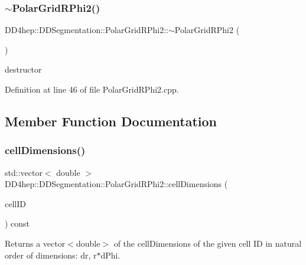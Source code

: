 \subsubsection{\texorpdfstring{$\sim$\+Polar\+Grid\+R\+Phi2()}{~PolarGridRPhi2()}}
{\footnotesize\ttfamily D\+D4hep\+::\+D\+D\+Segmentation\+::\+Polar\+Grid\+R\+Phi2\+::$\sim$\+Polar\+Grid\+R\+Phi2 (\begin{DoxyParamCaption}{ }\end{DoxyParamCaption})\hspace{0.3cm}{\ttfamily [virtual]}}



destructor 



Definition at line 46 of file Polar\+Grid\+R\+Phi2.\+cpp.



\subsection{Member Function Documentation}
\hypertarget{class_d_d4hep_1_1_d_d_segmentation_1_1_polar_grid_r_phi2_a64bcce17716dee34c3f648954a1ec830}{}\label{class_d_d4hep_1_1_d_d_segmentation_1_1_polar_grid_r_phi2_a64bcce17716dee34c3f648954a1ec830} 
\subsubsection{\texorpdfstring{cell\+Dimensions()}{cellDimensions()}}
{\footnotesize\ttfamily std\+::vector$<$ double $>$ D\+D4hep\+::\+D\+D\+Segmentation\+::\+Polar\+Grid\+R\+Phi2\+::cell\+Dimensions (\begin{DoxyParamCaption}\item[{const \hyperlink{namespace_d_d4hep_1_1_d_d_segmentation_ac7af071d85cb48820914434a07e21ba1}{Cell\+ID} \&}]{cell\+ID }\end{DoxyParamCaption}) const\hspace{0.3cm}{\ttfamily [virtual]}}



Returns a vector$<$double$>$ of the cell\+Dimensions of the given cell ID in natural order of dimensions\+: dr, r$\ast$d\+Phi. 

